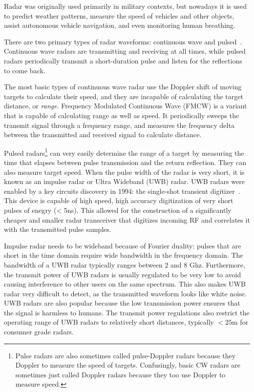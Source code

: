 \documentclass[12pt]{article}
\begin{document}
Radar was originally used primarily in military contexts, but nowadays
it is used to predict weather patterns, measure the speed of vehicles
and other objects, assist autonomous vehicle navigation, and even
monitoring human breathing.

There are two primary types of radar waveforms: continuous wave and
pulsed~\cite{Richards2010}. Continuous wave radars are transmitting
and receiving at all times, while pulsed radars periodically transmit a
short-duration pulse and listen for the reflections to come back.

The most basic types of continuous wave radar use the Doppler shift of
moving targets to calculate their speed, and they are incapable of
calculating the target distance, or \emph{range}. Frequency Modulated
Continuous Wave (FMCW) is a variant that is capable of calculating
range as well as speed. It periodically sweeps the transmit signal
through a frequency range, and measures the frequency delta between
the transmitted and received signal to calculate distance.

Pulsed radars\footnote{Pulse radars are also sometimes called
  pulse-Doppler radars because they Doppler to measure the speed of
  targets. Confusingly, basic CW radars are sometimes just called
  Doppler radars because they too use Doppler to measure speed.} can
very easily determine the range of a target by measuring the time that
elapses between pulse transmission and the return reflection. They can
also measure target speed. When the pulse width of the radar is very
short, it is known as an impulse radar or Ultra Wideband (UWB)
radar. UWB radars were enabled by a key circuits discovery in 1994:
the single-shot transient digitizer~\cite{}. This device is capable of
high speed, high accuracy digitization of very short pulses of enegry
(< 5ns). This allowed for the construction of a significantly cheaper
and smaller radar transceiver that digitizes incoming RF and
correlates it with the transmitted pulse samples. 

Impulse radar needs to be wideband because of Fourier duality:
pulses that are short in the time domain require wide bandwidth in the
frequency domain. The bandwidth of a UWB radar typically ranges
between 2 and 8 Ghz. Furthermore, the transmit power of UWB radars is
usually regulated to be very low to avoid causing interference to
other users on the same spectrum. This also makes UWB radar very
difficult to detect, as the transmitted waveform looks like white
noise. UWB radars are also popular because the low transmission power
ensures that the signal is harmless to humans. The transmit power
regulations also restrict the operating range of UWB radars to
relatively short distances, typically $<25$m for consumer grade
radars.
\end{document}
